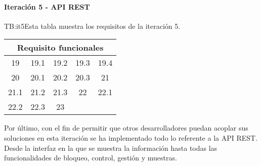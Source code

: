 \paragraph{Iteración 5 - API REST}
\begin{table}[Tabla de la iteración 5]{TB:it5}{Esta tabla muestra los requisitos de la iteración 5.}
  \begin{tabular}{ccccc}
  \multicolumn{5}{c}{\textbf{Requisito funcionales}} \\ \hline
    \hline
    19 & 19.1 & 19.2 & 19.3 & 19.4\\
    20 & 20.1 & 20.2 & 20.3 & 21 \\
    21.1 & 21.2 & 21.3 & 22 & 22.1 \\
    22.2 & 22.3 & 23 \\
    \hline
  \end{tabular}
\end{table}

Por último, con el fin de permitir que otros desarrolladores puedan acoplar sus soluciones en esta iteración se ha implementado todo lo referente a la API REST. Desde la interfaz en la que se muestra la información hasta todas las funcionalidades de bloqueo, control, gestión y muestras.